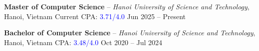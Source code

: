 
\begin{cvhonors}

  \cvhonor
    {\textbf{Master of Computer Science} -- \emph{Hanoi University of Science and Technology}, Hanoi, Vietnam \newline Current CPA: \textcolor{blue}{3.71/4.0}}
    {Jun 2025 -- Present}

  \cvhonor
    {\textbf{Bachelor of Computer Science} -- \emph{Hanoi University of Science and Technology}, Hanoi, Vietnam \newline CPA: \textcolor{blue}{3.48/4.0}}
    {Oct 2020 -- Jul 2024}


\end{cvhonors}

\vspace{1pt}
